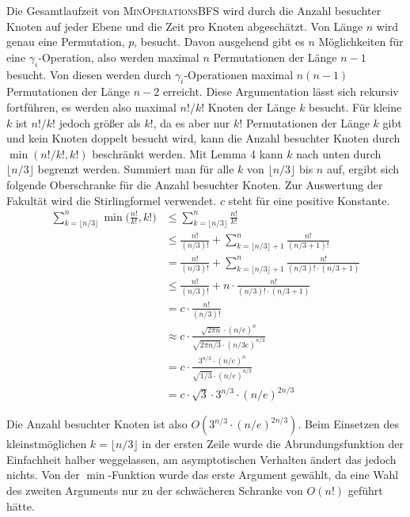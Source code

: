 \documentclass[a4paper, 10pt, ngerman]{article}
\begin{document}
Die Gesamtlaufzeit von \textsc{MinOperationsBFS} wird durch die Anzahl besuchter Knoten auf jeder Ebene und die Zeit pro Knoten abgeschätzt. Von Länge $n$ wird genau eine Permutation, $p$, besucht. Davon ausgehend gibt es $n$ Möglichkeiten für eine $\gamma_i$-Operation, also werden maximal $n$ Permutationen der Länge $n - 1$ besucht. Von diesen werden durch $\gamma_i$-Operationen maximal $n(n-1)$ Permutationen der Länge $n - 2$ erreicht. Diese Argumentation lässt sich rekursiv fortführen, es werden also maximal $n! / k!$ Knoten der Länge $k$ besucht. Für kleine $k$ ist $n! / k!$ jedoch größer als $k!$, da es aber nur $k!$ Permutationen der Länge $k$ gibt und kein Knoten doppelt besucht wird, kann die Anzahl besuchter Knoten durch $\min(n! / k!, k!)$ beschränkt werden. Mit Lemma 4 kann $k$ nach unten durch $\lfloor n/3 \rfloor$ begrenzt werden. Summiert man für alle $k$ von $\lfloor n/3 \rfloor$ bis $n$ auf, ergibt sich folgende Oberschranke für die Anzahl besuchter Knoten. Zur Auswertung der Fakultät wird die Stirlingformel verwendet. $c$ steht für eine positive Konstante.
\begin{align*}
    \sum_{k = \lfloor n/3 \rfloor}^n \min \bigg ( \frac {n!}{k!}, k! \bigg )
       & \le \sum_{k = \lfloor n/3 \rfloor}^n \frac {n!} {k!} 
    \\ & \le \frac {n!} {(n/3)!} + \sum_{k = \lfloor n/3 \rfloor + 1}^n \frac {n!} {(n / 3 + 1)!}
    \\ & = \frac {n!} {(n/3)!} + \sum_{k = \lfloor n/3 \rfloor + 1}^n \frac {n!} {(n/3)! \cdot (n / 3 + 1)}
    \\ & \le \frac {n!} {(n/3)!} + n \cdot \frac {n!} {(n/3)! \cdot (n/3 + 1)}
    \\ & = c \cdot \frac {n!} {(n/3)!}
    \\ & \approx c \cdot
    \frac {\sqrt{2 \pi n} \cdot (n/e)^n} {\sqrt{2 \pi n/3} \cdot (n/3e)^{n/3}}
    \\ & = c \cdot
    \frac {3^{n/3} \cdot (n/e)^n } {\sqrt{1/3} \cdot (n/e)^{n/3}}
    \\ & = c \cdot \sqrt 3 \cdot 3^{n/3} \cdot (n/e)^{2n/3}
\end{align*}

Die Anzahl besuchter Knoten ist also $O(3^{n/3} \cdot (n/e)^{2n/3})$. Beim Einsetzen des kleinstmöglichen $k = \lfloor n/3 \rfloor$ in der ersten Zeile wurde die Abrundungsfunktion der Einfachheit halber weggelassen, am asymptotischen Verhalten ändert das jedoch nichts. Von der $\min$-Funktion wurde das erste Argument gewählt, da eine Wahl des zweiten Arguments nur zu der schwächeren Schranke von $O(n!)$ geführt hätte.
\end{document}
